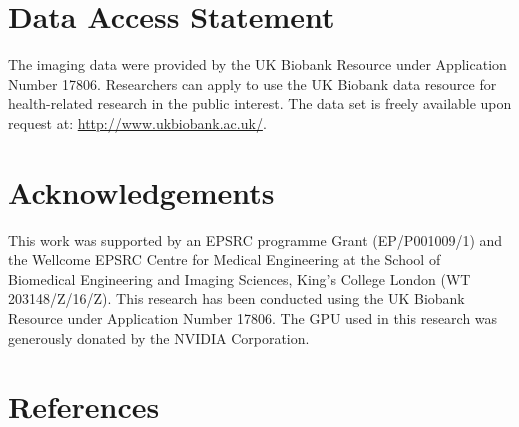 \documentclass[preprint,12pt,authoryear]{elsarticle}
\begin{document}
\section*{Data Access Statement}
The imaging data were provided by the UK Biobank Resource under Application Number 17806. Researchers can apply to use the UK Biobank data resource for health-related research in the public interest. The  data set is freely available upon request at: \url{http://www.ukbiobank.ac.uk/}.

\section*{Acknowledgements}
This work was supported by an EPSRC programme Grant (EP/P001009/1) and the Wellcome EPSRC Centre for Medical Engineering at the School of Biomedical Engineering and Imaging Sciences, King’s College London (WT 203148/Z/16/Z). This research has been conducted using the UK Biobank Resource under Application Number 17806. The GPU used in this research was generously donated by the NVIDIA Corporation.


\section*{References}

\end{document}

